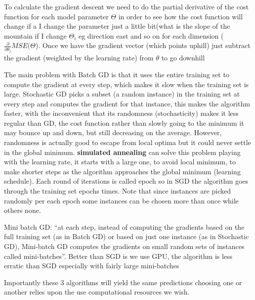 \documentclass[11pt]{article}
\begin{document}
To calculate the gradient descent we need to do the partial derivative of the cost function for each model parameter $\Theta$ in order to see how the cost function will change if a I change the parameter just a little bit(what is the slope of the mountain if I change $\Theta_i$ eg direction east and so on for each dimension ($\frac{\partial}{\partial \theta_j} MSE(\Theta$). Once we have the gradient vector (which points uphill) just subtract the gradient (weighted by the learning rate) from $\theta$ to go downhill

The main problem with Batch GD is that it uses the entire training set to compute the gradient at every step, which makes it slow when the training set is large. Stochastic GD picks a subset (a random instance) in the training set at every step and computes the gradient for that instance, this makes the algorithm faster, with the inconvenient that its randomness (stochasticity) makes it less regular than GD, the cost function rather than slowly going to the minimum it may bounce up and down, but still decreasing on the average. However, randomness is actually good to escape from local optima but it could never settle in the global minimum.
\textbf{simulated annealing} can solve this problem playing with the learning rate, it starts with a large one, to avoid local minimum, to make shorter steps as the algorithm approaches the global minimum (learning schedule).
Each round of iterations is called epoch so in SGD the algorithm goes through the training set epochs times. Note that since instances are picked randomly per each epoch some instances can be chosen more than once while others none.

Mini batch GD: “at each step, instead of computing the gradients based on the full training set (as in Batch GD) or based on just one instance (as in Stochastic GD), Mini-batch GD computes the gradients on small random sets of instances called mini-batches”. Better than SGD is we use GPU, the algorithm is less erratic than SGD especially with fairly large mini-batches

Importantly these 3 algorithms will yield the same predictions choosing one or another relies upon the use computational resources we wish.
\end{document}
